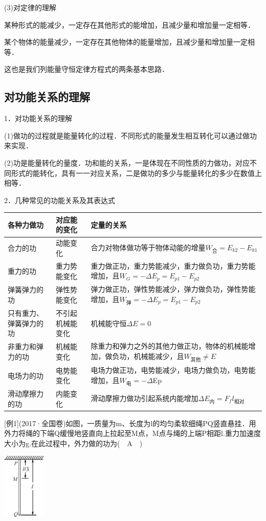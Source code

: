 \documentclass[cn,10.5pt,chinese,mac,chinesefont=founder]{elegantbook}
\begin{document}
(3)对定律的理解

某种形式的能减少，一定存在其他形式的能增加，且减少量和增加量一定相等．

某个物体的能量减少，一定存在其他物体的能量增加，且减少量和增加量一定相等．

这也是我们列能量守恒定律方程式的两条基本思路．

\newpage
\subsection{对功能关系的理解}

1．对功能关系的理解

(1)做功的过程就是能量转化的过程．不同形式的能量发生相互转化可以通过做功来实现．

(2)功是能量转化的量度．功和能的关系，一是体现在不同性质的力做功，对应不同形式的能转化，具有一一对应关系，二是做功的多少与能量转化的多少在数值上相等．

2．几种常见的功能关系及其表达式

\begin{longtable}[]{@{}m{2cm}m{1.5cm}m{10cm}@{}}
\toprule
各种力做功 & 对应能的变化 & 定量的关系\tabularnewline
\midrule
\endhead
合力的功 & 动能变化 &
合力对物体做功等于物体动能的增量$W_{\text{合}}=E_{k2}-E_{k1}$\tabularnewline
重力的功 & 重力势能变化 &
重力做正功，重力势能减少，重力做负功，重力势能增加，且$W_G=-\Delta E_p=E_{p1}-E_{p2}$\tabularnewline
弹簧弹力的功 & 弹性势能变化 &
弹力做正功，弹性势能减少，弹力做负功，弹性势能增加，且$W_{\text{弹}}=-\Delta E_p=E_{p1}-E_{p2}$\tabularnewline
只有重力、弹簧弹力的功 & 不引起机械能变化 &
机械能守恒$\Delta E=0$\tabularnewline
非重力和弹力的功 & 机械能变化 &
除重力和弹力之外的其他力做正功，物体的机械能增加，做负功，机械能减少，且$W_{\text{其他}}\neq E$\tabularnewline
电场力的功 & 电势能变化 &
电场力做正功，电势能减少，电场力做负功，电势能增加，且$W_{\text{电}}=-\Delta$Ep\tabularnewline
滑动摩擦力的功 & 内能变化 &
滑动摩擦力做功引起系统内能增加$\Delta E_{\text{内}}=F_fl_{\text{相对}}$\tabularnewline
\bottomrule
\end{longtable}

{[}例1{]}(2017·全国卷\uppercase\expandafter{})如图，一质量为m、长度为l的均匀柔软细绳PQ竖直悬挂．用外力将绳的下端Q缓慢地竖直向上拉起至M点，M点与绳的上端P相距l.重力加速度大小为g.在此过程中，外力做的功为(　A　)

\begin{center}\includegraphics[width=0.80208in,height=1.24514in]{media/image240.png}\end{center}
\end{document}
